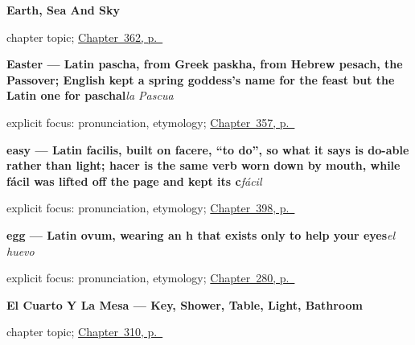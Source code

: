 \noindent\begin{minipage}[t]{\linewidth}
\raggedright
\textbf{Earth, Sea And Sky}\par
\footnotesize chapter topic; \hyperref[ch:la-tierra-y-el-mar]{Chapter~362, p.~\pageref*{ch:la-tierra-y-el-mar}}
\end{minipage}\par\smallskip

\noindent\begin{minipage}[t]{\linewidth}
\raggedright
\textbf{Easter — Latin pascha, from Greek paskha, from Hebrew pesach, the Passover; English kept a spring goddess's name for the feast but the Latin one for paschal}\enspace\emph{la Pascua}\par
\footnotesize explicit focus: pronunciation, etymology; \hyperref[ch:la-navidad-y-la-pascua]{Chapter~357, p.~\pageref*{ch:la-navidad-y-la-pascua}}
\end{minipage}\par\smallskip

\noindent\begin{minipage}[t]{\linewidth}
\raggedright
\textbf{easy — Latin facilis, built on facere, \textquotedblleft{}to do\textquotedblright{}, so what it says is do-able rather than light; hacer is the same verb worn down by mouth, while fácil was lifted off the page and kept its c}\enspace\emph{fácil}\par
\footnotesize explicit focus: pronunciation, etymology; \hyperref[ch:importante-y-facil]{Chapter~398, p.~\pageref*{ch:importante-y-facil}}
\end{minipage}\par\smallskip

\noindent\begin{minipage}[t]{\linewidth}
\raggedright
\textbf{egg — Latin ovum, wearing an h that exists only to help your eyes}\enspace\emph{el huevo}\par
\footnotesize explicit focus: pronunciation, etymology; \hyperref[ch:la-compra]{Chapter~280, p.~\pageref*{ch:la-compra}}
\end{minipage}\par\smallskip

\noindent\begin{minipage}[t]{\linewidth}
\raggedright
\textbf{El Cuarto Y La Mesa --- Key, Shower, Table, Light, Bathroom}\par
\footnotesize chapter topic; \hyperref[ch:el-cuarto-y-la-mesa]{Chapter~310, p.~\pageref*{ch:el-cuarto-y-la-mesa}}
\end{minipage}\par\smallskip

